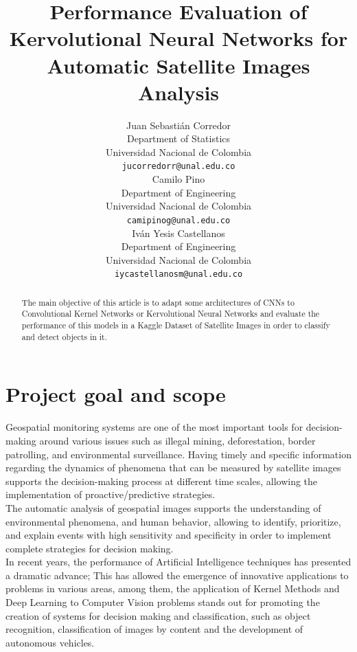 \documentclass{article}
\title{Performance Evaluation of Kervolutional Neural Networks for Automatic Satellite Images Analysis}
\author{
  Juan Sebastián Corredor\\%
  Department of Statistics\\
  Universidad Nacional de Colombia\\
  \texttt{jucorredorr@unal.edu.co} \\
   \And
   Camilo Pino\\%
  Department of Engineering\\
  Universidad Nacional de Colombia\\
  \texttt{camipinog@unal.edu.co} \\
   \And
  Iván Yesis Castellanos \\
  Department of Engineering\\
  Universidad Nacional de Colombia\\
  \texttt{iycastellanosm@unal.edu.co} \\
}
\begin{document}
\maketitle

\begin{abstract}
\small The main objective of this article is to adapt some architectures of CNNs to Convolutional Kernel Networks or Kervolutional Neural Networks and evaluate the performance of this models in a Kaggle Dataset of Satellite Images in order to classify and detect objects in it.
\end{abstract}


\small {}


\section{Project goal and scope}
% 
% 
% 
% 
Geospatial monitoring systems are one of the most important tools for decision-making around various issues such as illegal mining, deforestation, border patrolling, and environmental surveillance. Having timely and specific information regarding the dynamics of phenomena that can be measured by satellite images supports the decision-making process at different time scales, allowing the implementation of proactive/predictive strategies.\\

The automatic analysis of geospatial images supports the understanding of environmental phenomena, and human behavior, allowing to identify, prioritize, and explain events with high sensitivity and specificity in order to implement complete strategies for decision making.\\

In recent years, the performance of Artificial Intelligence techniques has presented a dramatic advance; This has allowed the emergence of innovative applications to problems in various areas, among them, the application of Kernel Methods and Deep Learning to Computer Vision problems stands out for promoting the creation of systems for decision making and classification, such as object recognition, classification of images by content and the development of autonomous vehicles.\\
\end{document}
